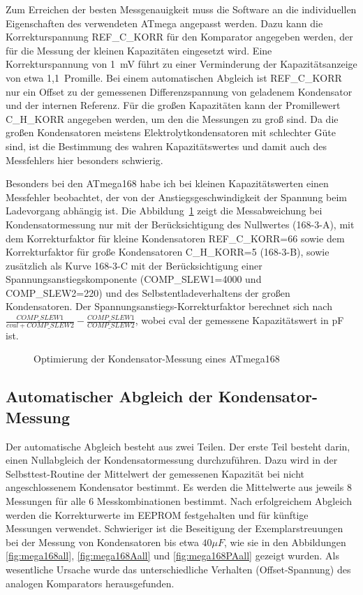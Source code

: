 Zum Erreichen der besten Messgenauigkeit muss die Software an die individuellen Eigenschaften des verwendeten ATmega
angepasst werden. Dazu kann die Korrekturspannung REF\_C\_KORR für den Komparator angegeben werden, der für die Messung der kleinen 
Kapazitäten eingesetzt wird. Eine Korrekturspannung von 1~mV führt zu einer Verminderung der Kapazitätsanzeige von etwa 1,1~Promille.
Bei einem automatischen Abgleich ist REF\_C\_KORR  nur ein Offset zu der gemessenen Differenzspannung von geladenem Kondensator
und der internen Referenz.
Für die großen Kapazitäten kann der Promillewert C\_H\_KORR angegeben werden, um den die Messungen
zu groß sind.
Da die großen Kondensatoren meistens Elektrolytkondensatoren mit schlechter Güte sind, ist die Bestimmung
des wahren Kapazitätswertes und damit auch des Messfehlers hier besonders schwierig.

Besonders bei den ATmega168 habe ich bei kleinen Kapazitätswerten einen Messfehler beobachtet, 
der von der Anstiegsgeschwindigkeit der Spannung beim Ladevorgang abhängig ist.
Die Abbildung~\ref{fig:mega168optcap} zeigt die Messabweichung bei Kondensatormessung nur mit der Berücksichtigung des
Nullwertes (168-3-A), mit dem Korrekturfaktor für kleine Kondensatoren REF\_C\_KORR=66 sowie dem Korrekturfaktor für große
Kondensatoren C\_H\_KORR=5 (168-3-B), sowie zusätzlich als Kurve 168-3-C  mit der Berücksichtigung einer Span\-nungs\-an\-stiegs\-kom\-po\-nen\-te 
(COMP\_SLEW1=4000 und COMP\_SLEW2=220) und des Selbst\-ent\-lade\-ver\-hal\-tens der großen Kon\-den\-sa\-toren.
Der Span\-nungs\-an\-stiegs-Kor\-rek\-tur\-faktor berechnet sich nach \(\frac{COMP\_SLEW1}{cval+COMP\_SLEW2} - \frac{COMP\_SLEW1}{COMP\_SLEW2}\),
wobei cval der gemessene Kapazitätswert in pF ist.

\begin{figure}[H]
\centering

\caption{Optimierung der Kondensator-Messung eines ATmega168}
\label{fig:mega168optcap}
\end{figure}

\subsection{Automatischer Abgleich der Kondensator-Messung}

Der automatische Abgleich besteht aus zwei Teilen. Der erste Teil besteht darin, einen Nullabgleich der Kondensatormessung durchzuführen.
Dazu wird in der Selbsttest-Routine der Mittelwert der gemessenen Kapazität bei nicht angeschlossenem Kondensator bestimmt.
Es werden die Mittelwerte aus jeweils 8 Messungen für alle 6 Messkombinationen bestimmt.
Nach erfolgreichem Abgleich werden die Korrekturwerte im EEPROM festgehalten und für künftige Messungen verwendet.
Schwieriger ist die Beseitigung der Exemplarstreuungen bei der Messung von Kondensatoren bis etwa \(40 \mu F\), wie sie in den 
Abbildungen \ref{fig:mega168all}, \ref{fig:mega168Aall} und \ref{fig:mega168PAall} gezeigt wurden.
Als wesentliche Ursache wurde das unterschiedliche Verhalten (Offset-Spannung) des analogen Komparators herausgefunden.

